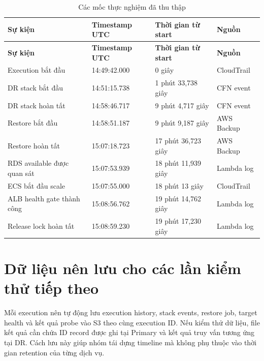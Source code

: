 \begin{longtable}{@{}p{4.1cm}p{3.5cm}p{3cm}p{2.7cm}@{}}
\caption{Các mốc thực nghiệm đã thu thập}\\
\toprule
\textbf{Sự kiện} & \textbf{Timestamp UTC} & \textbf{Thời gian từ start} & \textbf{Nguồn}\\
\midrule
\endfirsthead
\toprule
\textbf{Sự kiện} & \textbf{Timestamp UTC} & \textbf{Thời gian từ start} & \textbf{Nguồn}\\
\midrule
\endhead
Execution bắt đầu & 14:49:42.000 & 0 giây & CloudTrail\\
DR stack bắt đầu & 14:51:15.738 & 1 phút 33,738 giây & CFN event\\
DR stack hoàn tất & 14:58:46.717 & 9 phút 4,717 giây & CFN event\\
Restore bắt đầu & 14:58:51.187 & 9 phút 9,187 giây & AWS Backup\\
Restore hoàn tất & 15:07:18.723 & 17 phút 36,723 giây & AWS Backup\\
RDS available được quan sát & 15:07:53.939 & 18 phút 11,939 giây & Lambda log\\
ECS bắt đầu scale & 15:07:55.000 & 18 phút 13 giây & CloudTrail\\
ALB health gate thành công & 15:08:56.762 & 19 phút 14,762 giây & Lambda log\\
Release lock hoàn tất & 15:08:59.230 & 19 phút 17,230 giây & Lambda log\\
\bottomrule
\end{longtable}

\section{Dữ liệu nên lưu cho các lần kiểm thử tiếp theo}

Mỗi execution nên tự động lưu execution history, stack events, restore job, target health và kết quả probe vào S3 theo cùng execution ID. Nếu kiểm thử dữ liệu, file kết quả cần chứa ID record được ghi tại Primary và kết quả truy vấn tương ứng tại DR. Cách lưu này giúp nhóm tái dựng timeline mà không phụ thuộc vào thời gian retention của từng dịch vụ.
